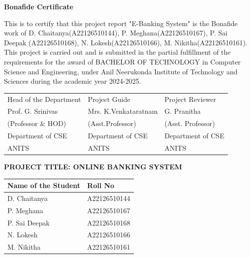 \begin{titlepage}
\thispagestyle{empty}
\begin{center}
    {\huge\bfseries Bonafide Certificate\par}
\end{center}
\vspace*{1cm}

This is to certify that this project report "E-Banking System" is the Bonafide
work of D. Chaitanya(A22126510144), P. Meghana(A22126510167), P. Sai Deepak
(A22126510168), N. Lokesh(A22126510166), M. Nikitha(A22126510161). This project
is carried out and is submitted in the partial fulfillment of the requirements
for the award of BACHELOR OF TECHNOLOGY in Computer Science and Engineering,
under Anil Neerukonda Institute of Technology and Sciences during the academic
year 2024-2025.

\vspace{1cm} %
\begin{tabular}{lll}
    Head of the Department & Project Guide & Project Reviewer \\
    Prof. G. Srinivas & Mrs. K.Venkataratnam & G. Pranitha \\
    (Professor \& HOD) & (Asst.Professor) & (Asst. Professor) \\
    Department of CSE & Department of CSE & Department of CSE \\
    ANITS & ANITS & ANITS \\
\end{tabular}

\end{titlepage}

\thispagestyle{empty}
\begin{center}
    \LARGE\textbf{PROJECT TITLE: ONLINE BANKING SYSTEM}\\
    \vspace{2cm}

    \begin{tabular}{|l|l|}
        \hline
        \textbf{Name of the Student} & \textbf{Roll No} \\
        \hline
        D. Chaitanya & A22126510144 \\
        \hline
        P. Meghana & A22126510167 \\
        \hline
        P. Sai Deepak & A22126510168 \\
        \hline
        N. Lokesh & A22126510166 \\
        \hline
        M. Nikitha & A22126510161 \\
        \hline
    \end{tabular}
\end{center}
\newpage

